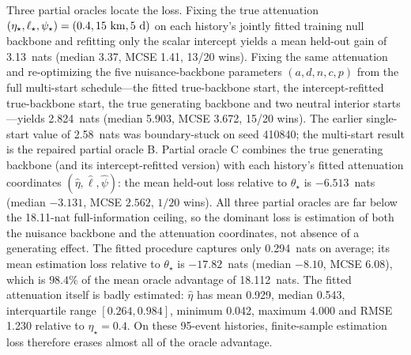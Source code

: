 Three partial oracles locate the loss. Fixing the true attenuation $(\eta_\star,\ell_\star,\psi_\star)=(0.4,15~{\rm km},5~{\rm d})$ on each history's jointly fitted training null backbone and refitting only the scalar intercept yields a mean held-out gain of 3.13~nats (median 3.37, MCSE 1.41, 13/20 wins). Fixing the same attenuation and re-optimizing the five nuisance-backbone parameters $(a,d,n,c,p)$ from the full multi-start schedule---the fitted true-backbone start, the intercept-refitted true-backbone start, the true generating backbone and two neutral interior starts---yields 2.824~nats (median 5.903, MCSE 3.672, 15/20 wins). The earlier single-start value of 2.58~nats was boundary-stuck on seed 410840; the multi-start result is the repaired partial oracle B. Partial oracle C combines the true generating backbone (and its intercept-refitted version) with each history's fitted attenuation coordinates $(\hat\eta,\hat\ell,\hat\psi)$: the mean held-out loss relative to $\theta_\star$ is $-6.513$~nats (median $-3.131$, MCSE $2.562$, $1/20$ wins). All three partial oracles are far below the 18.11-nat full-information ceiling, so the dominant loss is estimation of both the nuisance backbone and the attenuation coordinates, not absence of a generating effect. The fitted procedure captures only 0.294~nats on average; its mean estimation loss relative to $\theta_\star$ is $-17.82$~nats (median $-8.10$, MCSE $6.08$), which is $98.4\%$ of the mean oracle advantage of 18.112~nats. The fitted attenuation itself is badly estimated: $\hat\eta$ has mean 0.929, median 0.543, interquartile range $[0.264,0.984]$, minimum 0.042, maximum 4.000 and RMSE 1.230 relative to $\eta_\star=0.4$. On these 95-event histories, finite-sample estimation loss therefore erases almost all of the oracle advantage.

